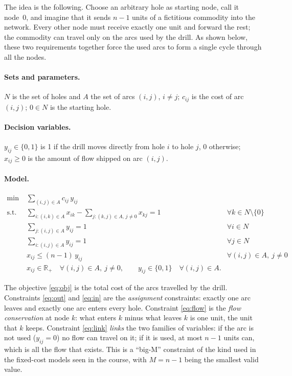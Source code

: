 \documentclass[11pt,a4paper]{article}
\begin{document}
The idea is the following. Choose an arbitrary hole as starting node, call it node~0, and
imagine that it sends $n-1$ units of a fictitious commodity into the network. Every other node
must receive exactly one unit and forward the rest; the commodity can travel only on the arcs
used by the drill. As shown below, these two requirements together force the used arcs to
form a single cycle through all the nodes.

\paragraph{Sets and parameters.}
$N$ is the set of holes and $A$ the set of arcs $(i,j)$, $i\neq j$; $c_{ij}$ is the cost of
arc $(i,j)$; $0\in N$ is the starting hole.

\paragraph{Decision variables.}
$y_{ij}\in\{0,1\}$ is 1 if the drill moves directly from hole $i$ to hole $j$, 0 otherwise;
$x_{ij}\ge0$ is the amount of flow shipped on arc $(i,j)$.

\paragraph{Model.}
\begin{align}
  \min\; & \sum_{(i,j)\in A} c_{ij}\, y_{ij} \label{eq:obj}\\
  \text{s.t.}\;
  & \sum_{i:(i,k)\in A} x_{ik} - \sum_{j:(k,j)\in A,\, j\neq 0} x_{kj} = 1 & \forall k\in N\setminus\{0\} \label{eq:flow}\\
  & \sum_{j:(i,j)\in A} y_{ij} = 1 & \forall i\in N \label{eq:out}\\
  & \sum_{i:(i,j)\in A} y_{ij} = 1 & \forall j\in N \label{eq:in}\\
  & x_{ij} \le (n-1)\, y_{ij} & \forall (i,j)\in A,\ j\neq 0 \label{eq:link}\\
  & x_{ij} \in \mathbb{R}_+ \quad \forall (i,j)\in A,\ j\neq 0, \qquad y_{ij}\in\{0,1\} \quad \forall (i,j)\in A. \nonumber
\end{align}

The objective \eqref{eq:obj} is the total cost of the arcs travelled by the drill. Constraints
\eqref{eq:out} and \eqref{eq:in} are the \emph{assignment} constraints: exactly one arc leaves
and exactly one arc enters every hole. Constraint \eqref{eq:flow} is the \emph{flow
conservation} at node $k$: what enters $k$ minus what leaves $k$ is one unit, the unit that
$k$ keeps. Constraint \eqref{eq:link} \emph{links} the two families of variables: if the arc is
not used ($y_{ij}=0$) no flow can travel on it; if it is used, at most $n-1$ units can, which
is all the flow that exists. This is a ``big-M'' constraint of the kind used in the fixed-cost
models seen in the course, with $M=n-1$ being the smallest valid value.
\end{document}
